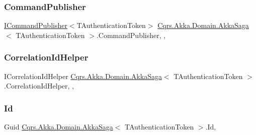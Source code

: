 \subsubsection{\texorpdfstring{Command\+Publisher}{CommandPublisher}}
{\footnotesize\ttfamily \hyperlink{interfaceCqrs_1_1Commands_1_1ICommandPublisher}{I\+Command\+Publisher}$<$T\+Authentication\+Token$>$ \hyperlink{classCqrs_1_1Akka_1_1Domain_1_1AkkaSaga}{Cqrs.\+Akka.\+Domain.\+Akka\+Saga}$<$ T\+Authentication\+Token $>$.Command\+Publisher\hspace{0.3cm}{\ttfamily [get]}, {\ttfamily [set]}, {\ttfamily [protected]}}

\mbox{\label{classCqrs_1_1Akka_1_1Domain_1_1AkkaSaga_a11d543b42aa6e55644c2b349336e962a_a11d543b42aa6e55644c2b349336e962a}} 
\subsubsection{\texorpdfstring{Correlation\+Id\+Helper}{CorrelationIdHelper}}
{\footnotesize\ttfamily I\+Correlation\+Id\+Helper \hyperlink{classCqrs_1_1Akka_1_1Domain_1_1AkkaSaga}{Cqrs.\+Akka.\+Domain.\+Akka\+Saga}$<$ T\+Authentication\+Token $>$.Correlation\+Id\+Helper\hspace{0.3cm}{\ttfamily [get]}, {\ttfamily [set]}, {\ttfamily [protected]}}

\mbox{\label{classCqrs_1_1Akka_1_1Domain_1_1AkkaSaga_a98fa8a5ebc587bc02b1c98d5ffbc997e_a98fa8a5ebc587bc02b1c98d5ffbc997e}} 
\subsubsection{\texorpdfstring{Id}{Id}}
{\footnotesize\ttfamily Guid \hyperlink{classCqrs_1_1Akka_1_1Domain_1_1AkkaSaga}{Cqrs.\+Akka.\+Domain.\+Akka\+Saga}$<$ T\+Authentication\+Token $>$.Id\hspace{0.3cm}{\ttfamily [get]}, {}}

